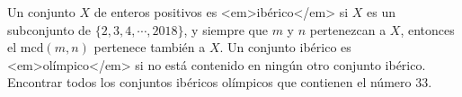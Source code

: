 Un conjunto $X$ de enteros positivos es <em>ibérico</em> si $X$ es un subconjunto de $\{ 2,3,4, \cdots ,2018\}$, y siempre que $m$ y $n$ pertenezcan a $X$, entonces el $\textrm{mcd}(m,n)$ pertenece también a $X$. Un conjunto ibérico es <em>olímpico</em> si no está contenido en ningún otro conjunto ibérico. Encontrar todos los conjuntos ibéricos olímpicos que contienen el número $33$.

